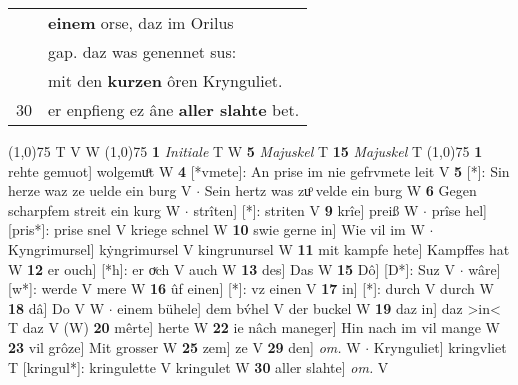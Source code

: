 \documentclass[8pt,a4paper,notitlepage]{article}
\begin{document}
\begin{table}[ht]
\begin{minipage}[t]{0.5\linewidth}
\begin{tabular}{rl}
 & \textbf{einem} orse, daz im Orilus\\ 
 & gap. daz was genennet sus:\\ 
 & mit den \textbf{kurzen} ôren Krynguliet.\\ 
30 & er enpfieng ez âne \textbf{aller slahte} bet.\\ 
\end{tabular}
\scriptsize
\line(1,0){75} \newline
T V W \newline
\line(1,0){75} \newline
\textbf{1} \textit{Initiale} T W  \textbf{5} \textit{Majuskel} T  \textbf{15} \textit{Majuskel} T  \newline
\line(1,0){75} \newline
\textbf{1} rehte gemuot] wolgemuͦt W \textbf{4} [*vmete]: An prise im nie gefrvmete leit V \textbf{5} [*]: Sin herze waz ze uelde ein burg V  $\cdot$ Sein hertz was zuͦ velde ein burg W \textbf{6} Gegen scharpfem streit ein kurg W  $\cdot$ strîten] [*]: striten V \textbf{9} krîe] preiß W  $\cdot$ prîse hel] [pris*]: prise snel V kriege schnel W \textbf{10} swie gerne in] Wie vil im W  $\cdot$ Kyngrimursel] kẏngrimursel V kingrunursel W \textbf{11} mit kampfe hete] Kampffes hat W \textbf{12} er ouch] [*h]: er oͮch V auch W \textbf{13} des] Das W \textbf{15} Dô] [D*]: Suz V  $\cdot$ wâre] [w*]: werde V mere W \textbf{16} ûf einen] [*]: vz einen V \textbf{17} in] [*]: durch V durch W \textbf{18} dâ] Do V W  $\cdot$ einem bühele] dem bv́hel V der buckel W \textbf{19} daz in] daz >in< T daz V (W) \textbf{20} mêrte] herte W \textbf{22} ie nâch maneger] Hin nach im vil mange W \textbf{23} vil grôze] Mit grosser W \textbf{25} zem] ze V \textbf{29} den] \textit{om.} W  $\cdot$ Krynguliet] kringvliet T [kringul*]: kringulette V kringulet W \textbf{30} aller slahte] \textit{om.} V \newline
\end{minipage}
\end{table}
\end{document}
